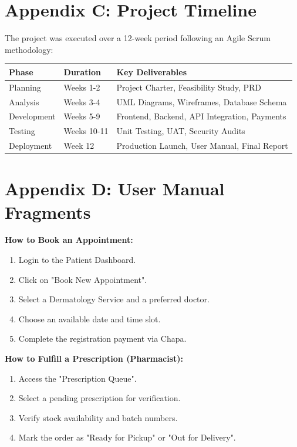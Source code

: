 \documentclass[12pt,a4paper]{report}
\begin{document}
\section{Appendix C: Project Timeline}
The project was executed over a 12-week period following an Agile Scrum methodology:
\begin{table}[H]
\centering
\begin{tabular}{|l|l|p{8cm}|}
\hline
\textbf{Phase} & \textbf{Duration} & \textbf{Key Deliverables} \\ \hline
Planning & Weeks 1-2 & Project Charter, Feasibility Study, PRD \\ \hline
Analysis & Weeks 3-4 & UML Diagrams, Wireframes, Database Schema \\ \hline
Development & Weeks 5-9 & Frontend, Backend, API Integration, Payments \\ \hline
Testing & Weeks 10-11 & Unit Testing, UAT, Security Audits \\ \hline
Deployment & Week 12 & Production Launch, User Manual, Final Report \\ \hline
\end{tabular}
\end{table}

\section{Appendix D: User Manual Fragments}
\textbf{How to Book an Appointment:}
\begin{enumerate}
    \item Login to the Patient Dashboard.
    \item Click on "Book New Appointment".
    \item Select a Dermatology Service and a preferred doctor.
    \item Choose an available date and time slot.
    \item Complete the registration payment via Chapa.
\end{enumerate}

\textbf{How to Fulfill a Prescription (Pharmacist):}
\begin{enumerate}
    \item Access the "Prescription Queue".
    \item Select a pending prescription for verification.
    \item Verify stock availability and batch numbers.
    \item Mark the order as "Ready for Pickup" or "Out for Delivery".
\end{enumerate}
\end{document}
